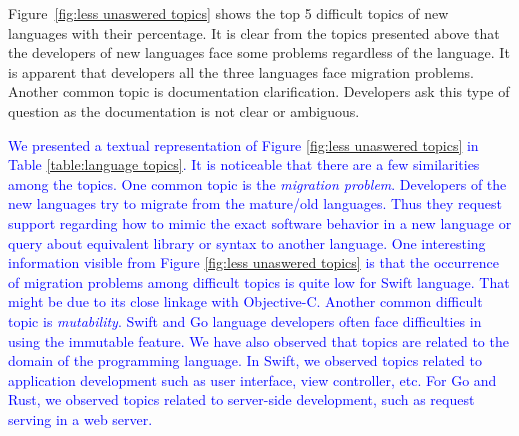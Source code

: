 Figure~\ref{fig:less unaswered topics} shows the top 5 difficult topics of new languages with their percentage. It is clear from the topics presented above that the developers of new languages face some problems regardless of the language. 
It is apparent that developers all the three languages face migration problems. 
Another common topic is documentation clarification. Developers ask this type of question as the documentation is not clear or ambiguous. 

\textcolor{blue}{We presented a textual representation of Figure \ref{fig:less unaswered topics} in Table \ref{table:language topics}. It is noticeable that there are a few similarities among the topics. One common topic is the  \emph{migration problem}. Developers of the new languages try to migrate from the mature/old languages. Thus they request support regarding how to mimic the exact software behavior in a new language or query about equivalent library or syntax to another language. One interesting information visible from Figure \ref{fig:less unaswered topics} is that the occurrence of migration problems among difficult topics is quite low for Swift language. That might be due to its close linkage with Objective-C. Another common difficult topic is  \emph{mutability}. Swift and Go language developers often face difficulties in using the immutable feature. We have also observed that topics are related to the domain of the programming language. In Swift, we observed topics related to application development such as user interface, view controller, etc. For Go and Rust, we observed topics related to server-side development, such as request serving in a web server.}

